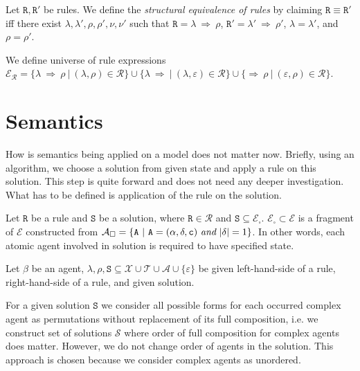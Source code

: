 \documentclass{entcs}
\renewcommand{\~}[0]{\texttildelow}
\begin{document}
\begin{defn}
Let $\mathtt{R},\mathtt{R}'$ be rules. We define the \emph{structural equivalence of rules} by claiming $\mathtt{R} \equiv \mathtt{R}'$ iff there exist $\lambda, \lambda', \rho, \rho', \nu, \nu'$ such that $\mathtt{R}=\lambda ~\Rightarrow~ \rho$, $\mathtt{R}'=\lambda' ~\Rightarrow~ \rho'$, $\lambda=\lambda'$, and $\rho=\rho'$.
\end{defn}

\begin{theorem}
We define universe of rule expressions\\ $\mathcal{E}_\mathcal{R} = \{ \lambda ~\Rightarrow~ \rho ~|~ (\lambda, \rho) \in \mathcal{R} \} \cup \{ \lambda ~\Rightarrow ~|~ (\lambda, \varepsilon) \in \mathcal{R} \} \cup \{ \Rightarrow~ \rho ~|~ (\varepsilon, \rho) \in \mathcal{R} \}$.
\end{theorem}

\section{Semantics}

How is semantics being applied on a model does not matter now. Briefly, using an algorithm, we choose a solution from given state and apply a rule on this solution. This step is quite forward and does not need any deeper investigation. What has to be defined is application of the rule on the solution.

Let $\mathtt{R}$ be a rule and $\mathtt{S}$ be a solution, where $\mathtt{R} \in \mathcal{R}$ and $\mathtt{S} \subseteq \mathcal{E}_{\square}$. $\mathcal{E}_{\square} \subset \mathcal{E}$ is a fragment of $\mathcal{E}$ constructed from $\mathcal{A}_{\square} = \{ \mathtt{A}~|~\mathtt{A} = (\alpha, \delta, \mathtt{c}) ~\emph{and}~ |\delta| = 1 \} $. In other words, each atomic agent involved in solution is required to have specified state.

Let $\beta$ be an agent, $\lambda, \rho, \mathtt{S} \subseteq \mathcal{X} \cup \mathcal{T} \cup \mathcal{A} \cup \{\varepsilon\}$ be given left-hand-side of a rule, right-hand-side of a rule, and given solution.

\begin{definition}
For a given solution $\mathtt{S}$ we consider all possible forms for each occurred complex agent as permutations without replacement of its full composition, i.e. we construct set of solutions $\mathcal{S}$ where order of full composition for complex agents does matter. However, we do not change order of agents in the solution. This approach is chosen because we consider complex agents as unordered.
\end{definition}
\end{document}
